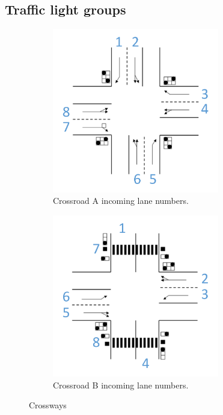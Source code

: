\newpage
\subsection{Traffic light groups}
\begin{figure}
	\centering
	\begin{subfigure}{.5\textwidth}
		\centering
		\includegraphics[width=0.8\textwidth]{figures/CrossroadAL.pdf}
		\caption{Crossroad A incoming lane numbers.}
		\label{fig:cral}
	\end{subfigure}%
	\begin{subfigure}{.5\textwidth}
		\centering
		\includegraphics[width=0.8\textwidth]{figures/CrossroadBL.pdf}
		\caption{Crossroad B incoming lane numbers.}
		\label{fig:crbl}
	\end{subfigure}
	\caption{Crossways}
	\label{fig:tlg}
\end{figure}


